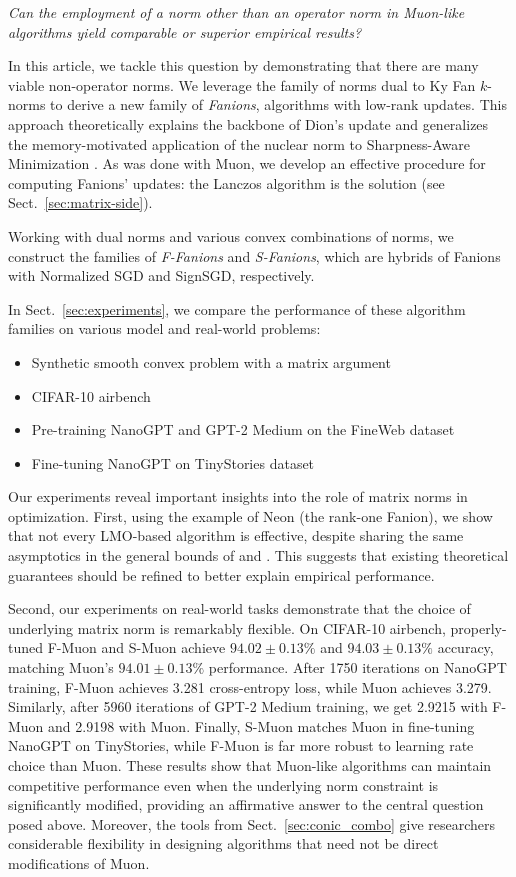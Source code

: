 \documentclass[smallextended,referee,envcountsect]{svjour3}
\newcommand{\sectionref}[1]{Sect.~\ref{#1}}
\begin{document}
 \emph{Can the employment of a norm other than an operator norm in Muon-like algorithms yield comparable or superior empirical results?}
 
 In this article, we tackle this question by demonstrating that there are many viable non-operator norms. We leverage the family of norms dual to Ky Fan $k$-norms to derive a new family of \emph{Fanions}, algorithms with low-rank updates. This approach theoretically explains the backbone of Dion's update \citep{ahn2025dion} and generalizes the memory-motivated application of the nuclear norm to Sharpness-Aware Minimization \citep{pethick2025sam}. As was done with Muon, we develop an effective procedure for computing Fanions' updates: the Lanczos algorithm is the solution (see \sectionref{sec:matrix-side}).
 
 Working with dual norms and various convex combinations of norms, we construct the families of \emph{F-Fanions} and \emph{S-Fanions}, which are hybrids of Fanions with Normalized SGD and SignSGD, respectively.
 
 In \sectionref{sec:experiments}, we compare the performance of these algorithm families on various model and real-world problems:
 \begin{itemize}
   \item Synthetic smooth convex problem with a matrix argument
   \item CIFAR-10 airbench \citep{cifar2023airbench}
   \item Pre-training NanoGPT and GPT-2 Medium on the FineWeb dataset \citep{modded_nanogpt_2024}
   \item Fine-tuning NanoGPT on TinyStories dataset \citep{eldan2023tinystoriessmalllanguagemodels}
 \end{itemize}
 
 Our experiments reveal important insights into the role of matrix norms in optimization. First, using the example of Neon (the rank-one Fanion), we show that not every LMO-based algorithm is effective, despite sharing the same asymptotics in the general bounds of \citep{kovalev2025understanding} and \citep{riabinin2025gluon}. This suggests that existing theoretical guarantees should be refined to better explain empirical performance.
 
 Second, our experiments on real-world tasks demonstrate that the choice of underlying matrix norm is remarkably flexible. On CIFAR-10 airbench, properly-tuned F-Muon and S-Muon achieve $94.02 \pm 0.13\%$ and $94.03 \pm 0.13\%$ accuracy, matching Muon's $94.01 \pm 0.13\%$ performance. After 1750 iterations on NanoGPT training, F-Muon achieves 3.281 cross-entropy loss, while Muon achieves 3.279. Similarly, after 5960 iterations of GPT-2 Medium training, we get 2.9215 with F-Muon and 2.9198 with Muon. Finally, S-Muon matches Muon in fine-tuning NanoGPT on TinyStories, while F-Muon is far more robust to learning rate choice than Muon. These results show that Muon-like algorithms can maintain competitive performance even when the underlying norm constraint is significantly modified, providing an affirmative answer to the central question posed above. Moreover, the tools from \sectionref{sec:conic_combo} give researchers considerable flexibility in designing algorithms that need not be direct modifications of Muon.
 
\end{document}
